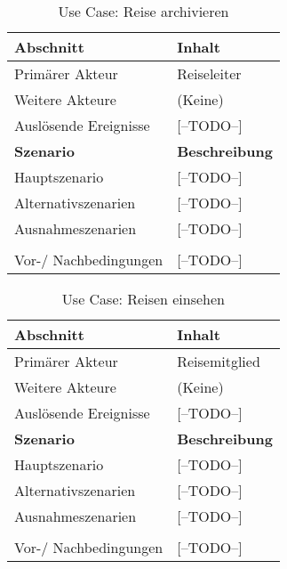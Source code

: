 \begin{table}[H]
	\footnotesize
	\caption{Use Case: Reise archivieren}
	\begin{tabularx}{0.95\textwidth}{ |l|X| }
		\hline
		\rowcolor{gray} \textbf{Abschnitt}     & \textbf{Inhalt}       \\
		\hline
		Primärer Akteur                        & Reiseleiter           \\
		\hline
		Weitere Akteure                        & (Keine)               \\
		\hline
		Auslösende Ereignisse                  & [--TODO--]            \\

		\hline
		\rowcolor{lightgray} \textbf{Szenario} & \textbf{Beschreibung} \\
		\hline
		Hauptszenario                          & [--TODO--]            \\
		\hline
		Alternativszenarien                    & [--TODO--]            \\
		\hline
		Ausnahmeszenarien                      & [--TODO--]            \\
		\hline
		\rowcolor{lightgray}                   &                       \\
		\hline
		Vor-/ Nachbedingungen                  & [--TODO--]            \\
		\hline
	\end{tabularx}
\end{table}


\begin{table}[H]
	\footnotesize
	\caption{Use Case: Reisen einsehen}
	\begin{tabularx}{0.95\textwidth}{ |l|X| }
		\hline
		\rowcolor{gray} \textbf{Abschnitt}     & \textbf{Inhalt}       \\
		\hline
		Primärer Akteur                        & Reisemitglied         \\
		\hline
		Weitere Akteure                        & (Keine)               \\
		\hline
		Auslösende Ereignisse                  & [--TODO--]            \\

		\hline
		\rowcolor{lightgray} \textbf{Szenario} & \textbf{Beschreibung} \\
		\hline
		Hauptszenario                          & [--TODO--]            \\
		\hline
		Alternativszenarien                    & [--TODO--]            \\
		\hline
		Ausnahmeszenarien                      & [--TODO--]            \\
		\hline
		\rowcolor{lightgray}                   &                       \\
		\hline
		Vor-/ Nachbedingungen                  & [--TODO--]            \\
		\hline
	\end{tabularx}
\end{table}


